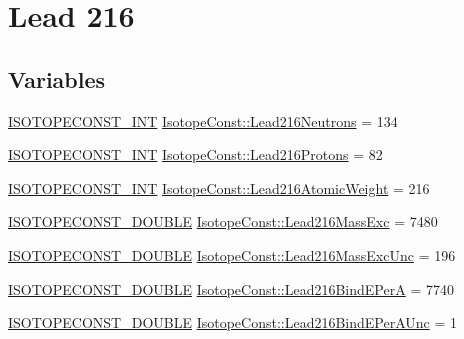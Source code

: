 \hypertarget{group___isotope_const-_lead-_pb216}{}\section{Lead 216}
\label{group___isotope_const-_lead-_pb216}
\subsection*{Variables}
\begin{DoxyCompactItemize}
\item 
\mbox{\hyperlink{group___isotope_const-_macros_ga5f18360b3e99483a35c32d789e62621c}{I\+S\+O\+T\+O\+P\+E\+C\+O\+N\+S\+T\+\_\+\+I\+NT}} \mbox{\hyperlink{group___isotope_const-_lead-_pb216_ga7fbee6b0db6958c52fb21dd97d6112c5}{Isotope\+Const\+::\+Lead216\+Neutrons}} = 134
\item 
\mbox{\hyperlink{group___isotope_const-_macros_ga5f18360b3e99483a35c32d789e62621c}{I\+S\+O\+T\+O\+P\+E\+C\+O\+N\+S\+T\+\_\+\+I\+NT}} \mbox{\hyperlink{group___isotope_const-_lead-_pb216_ga61b844deda163ab49236127f334d27a5}{Isotope\+Const\+::\+Lead216\+Protons}} = 82
\item 
\mbox{\hyperlink{group___isotope_const-_macros_ga5f18360b3e99483a35c32d789e62621c}{I\+S\+O\+T\+O\+P\+E\+C\+O\+N\+S\+T\+\_\+\+I\+NT}} \mbox{\hyperlink{group___isotope_const-_lead-_pb216_ga8d92c9089e934fee46d815cb3c58e681}{Isotope\+Const\+::\+Lead216\+Atomic\+Weight}} = 216
\item 
\mbox{\hyperlink{group___isotope_const-_macros_ga8f45a7272ce02c0b4c65c44636ed719a}{I\+S\+O\+T\+O\+P\+E\+C\+O\+N\+S\+T\+\_\+\+D\+O\+U\+B\+LE}} \mbox{\hyperlink{group___isotope_const-_lead-_pb216_ga55982e8a4b9e6ba0acdbeba77387999c}{Isotope\+Const\+::\+Lead216\+Mass\+Exc}} = 7480
\item 
\mbox{\hyperlink{group___isotope_const-_macros_ga8f45a7272ce02c0b4c65c44636ed719a}{I\+S\+O\+T\+O\+P\+E\+C\+O\+N\+S\+T\+\_\+\+D\+O\+U\+B\+LE}} \mbox{\hyperlink{group___isotope_const-_lead-_pb216_ga963b8c6bbb3d9b5e00105948f699e662}{Isotope\+Const\+::\+Lead216\+Mass\+Exc\+Unc}} = 196
\item 
\mbox{\hyperlink{group___isotope_const-_macros_ga8f45a7272ce02c0b4c65c44636ed719a}{I\+S\+O\+T\+O\+P\+E\+C\+O\+N\+S\+T\+\_\+\+D\+O\+U\+B\+LE}} \mbox{\hyperlink{group___isotope_const-_lead-_pb216_gad0d8078f4262509034d88ad0c343ea0c}{Isotope\+Const\+::\+Lead216\+Bind\+E\+PerA}} = 7740
\item 
\mbox{\hyperlink{group___isotope_const-_macros_ga8f45a7272ce02c0b4c65c44636ed719a}{I\+S\+O\+T\+O\+P\+E\+C\+O\+N\+S\+T\+\_\+\+D\+O\+U\+B\+LE}} \mbox{\hyperlink{group___isotope_const-_lead-_pb216_ga6bdf24a5d6fa023e9dddf1750de89548}{Isotope\+Const\+::\+Lead216\+Bind\+E\+Per\+A\+Unc}} = 1

\end{DoxyCompactItemize}

